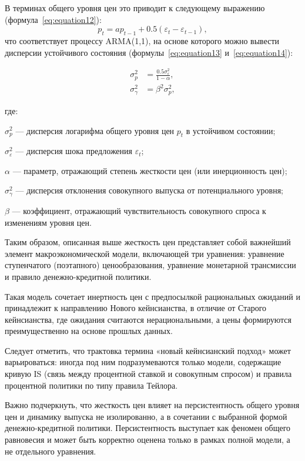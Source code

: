 В терминах общего уровня цен это приводит к следующему выражению (формула~\eqref{eq:equation12}):
\begin{equation}
	\label{eq:equation12}
	p_t = a p_{t-1} + 0.5(\varepsilon_t - \varepsilon_{t-1}),
\end{equation}
что соответствует процессу ARMA(1,1), на основе которого можно вывести дисперсии устойчивого состояния (формулы~\eqref{eq:equation13} и~\eqref{eq:equation14}):

\begin{align}
	\sigma_p^2 &= \frac{0.5 \sigma_\varepsilon^2}{1 - \alpha},
	\label{eq:equation13} \\
	\sigma_\gamma^2 &= \beta^2 \sigma_p^2,
	\label{eq:equation14}
\end{align}

где:
\par
$\sigma_p^2$ — дисперсия логарифма общего уровня цен $p_t$ в устойчивом состоянии;
\par
$\sigma_\varepsilon^2$ — дисперсия шока предложения $\varepsilon_t$;
\par
$\alpha$ — параметр, отражающий степень жесткости цен (или инерционность цен);
\par
$\sigma_\gamma^2$ — дисперсия отклонения совокупного выпуска от потенциального уровня;
\par
$\beta$ — коэффициент, отражающий чувствительность совокупного спроса к изменениям уровня цен.

Таким образом, описанная выше жесткость цен представляет собой важнейший элемент макроэкономической модели, включающей три уравнения: уравнение ступенчатого (поэтапного) ценообразования, уравнение монетарной трансмиссии и правило денежно-кредитной политики.

Такая модель сочетает инертность цен с предпосылкой рациональных ожиданий и принадлежит к направлению Нового кейнсианства, в отличие от Старого кейнсианства, где ожидания считаются нерациональными, а цены формируются преимущественно на основе прошлых данных.

Следует отметить, что трактовка термина «новый кейнсианский подход» может варьироваться: иногда под ним подразумеваются только модели, содержащие кривую IS (связь между процентной ставкой и совокупным спросом) и правила процентной политики по типу правила Тейлора.

Важно подчеркнуть, что жесткость цен влияет на персистентность общего уровня цен и динамику выпуска не изолированно, а в сочетании с выбранной формой денежно-кредитной политики. Персистентность выступает как феномен общего равновесия и может быть корректно оценена только в рамках полной модели, а не отдельного уравнения.

